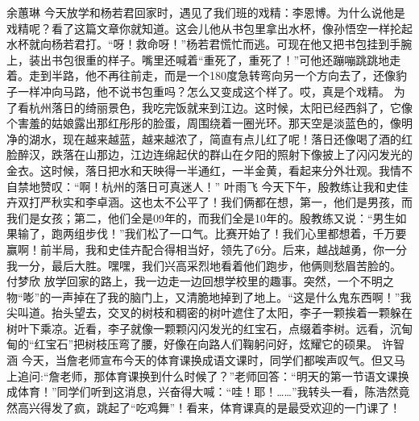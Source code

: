 \markdownRendererInterblockSeparator
{}\markdownRendererInterblockSeparator
{}余蕙琳\markdownRendererInterblockSeparator
{}今天放学和杨若君回家时，遇见了我们班的戏精：李恩博。为什么说他是戏精呢？看了这篇文章你就知道。这会儿他从书包里拿出水杯，像孙悟空一样抡起水杯就向杨若君打。“呀！救命呀！”杨若君慌忙而逃。可现在他又把书包挂到手腕上，装出书包很重的样子。嘴里还喊着“重死了，重死了！”可他还蹦嘣跳跳地走着。走到半路，他不再往前走，而是一个180度急转弯向另一个方向去了，还像豹子一样冲向马路，他不说书包重吗？怎么又变成这个样了。哎，真是个戏精。\markdownRendererInterblockSeparator
{}\markdownRendererInterblockSeparator
{}为了看杭州落日的绮丽景色，我吃完饭就来到江边。这时候，太阳已经西斜了，它像个害羞的姑娘露出那红彤彤的脸蛋，周围绕着一圈光环。那天空是淡蓝色的，像明净的湖水，现在越来越蓝，越来越浓了，简直有点儿红了呢！落日还像喝了酒的红脸醉汉，跌落在山那边，江边连绵起伏的群山在夕阳的照射下像披上了闪闪发光的金衣。这时候，落日把水和天映得一半通红，一半金黄，看起来分外壮观。我情不自禁地赞叹：“啊！杭州的落日可真迷人！”\markdownRendererInterblockSeparator
{}\markdownRendererInterblockSeparator
{}叶雨飞\markdownRendererInterblockSeparator
{}今天下午，殷教练让我和史佳卉双打严秋实和李卓涵。这也太不公平了！我们俩都在想，第一，他们是男孩，而我们是女孩；第二，他们全是09年的，而我们全是10年的。殷教练又说：“男生如果输了，跑两组步伐！”我们松了一口气。比赛开始了！我们心里都想着，千万要赢啊！前半局，我和史佳卉配合得相当好，领先了6分。后来，越战越勇，你一分我一分，最后大胜。嘿嘿，我们兴高采烈地看着他们跑步，他俩则愁眉苦脸的。\markdownRendererInterblockSeparator
{}\markdownRendererInterblockSeparator
{}付梦欣\markdownRendererInterblockSeparator
{}放学回家的路上，我一边走一边回想学校里的趣事。突然，一个不明之物“嘭”的一声掉在了我的脑门上，又清脆地掉到了地上。“这是什么鬼东西啊！”我尖叫道。抬头望去，交叉的树枝和稠密的树叶遮住了太阳，李子一颗挨着一颗躲在树叶下乘凉。近看，李子就像一颗颗闪闪发光的红宝石，点缀着李树。远看，沉甸甸的“红宝石”把树枝压弯了腰，好像在向路人们鞠躬问好，炫耀它的硕果。\markdownRendererInterblockSeparator
{}\markdownRendererInterblockSeparator
{}许智涵\markdownRendererInterblockSeparator
{}今天，当詹老师宣布今天的体育课换成语文课时，同学们都唉声叹气。但又马上追问:“詹老师，那体育课换到什么时候了？”老师回答：“明天的第一节语文课换成体育！”同学们听到这消息，兴奋得大喊：“哇！耶！……”我转头一看，陈浩然竟然高兴得发了疯，跳起了“吃鸡舞”！看来，体育课真的是最受欢迎的一门课了！ \markdownRendererInterblockSeparator
